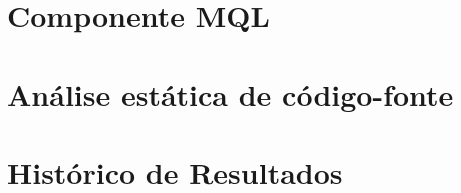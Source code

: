 \begin{apendicesenv}
\chapter{Componente MQL}


\chapter{Análise estática de código-fonte}


\chapter{Histórico de Resultados}

\end{apendicesenv}
